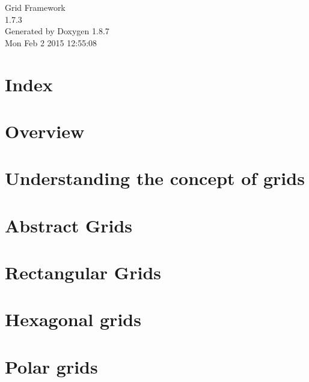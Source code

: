 \documentclass[twoside]{book}
\newcommand{\+}{\discretionary{\mbox{\scriptsize$\hookleftarrow$}}{}{}}
\newcommand{\clearemptydoublepage}{%
  \newpage{\pagestyle{empty}\cleardoublepage}%
}
\begin{document}
\hypersetup{pageanchor=false,
             bookmarks=true,
             bookmarksnumbered=true,
             pdfencoding=unicode
            }
\begin{titlepage}
\vspace*{7cm}
\begin{center}%
{\Large Grid Framework \\[1ex]\large 1.\+7.\+3 }\\
\vspace*{1cm}
{\large Generated by Doxygen 1.8.7}\\
\vspace*{0.5cm}
{\small Mon Feb 2 2015 12:55:08}\\
\end{center}
\end{titlepage}
\clearemptydoublepage
\tableofcontents
\clearemptydoublepage
{}
\hypersetup{pageanchor=true}

\chapter{Index}
\label{index}\hypertarget{index}{}
\chapter{Overview}
\label{overview}
\hypertarget{overview}{}

\chapter{Understanding the concept of grids}
\label{concept_of_grid}
\hypertarget{concept_of_grid}{}

\chapter{Abstract Grids}
\label{abstract_grids}
\hypertarget{abstract_grids}{}

\chapter{Rectangular Grids}
\label{rectangular_grid}
\hypertarget{rectangular_grid}{}

\chapter{Hexagonal grids}
\label{hex_grid}
\hypertarget{hex_grid}{}

\chapter{Polar grids}
\label{polar_grid}
\hypertarget{polar_grid}{}

\end{document}
